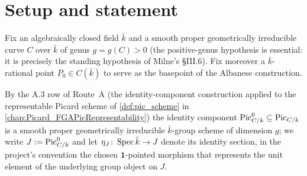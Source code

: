 %
%

\section{Setup and statement}
\label{sec:albaneseup_setup}

Fix an algebraically closed field \(\bar k\) and a smooth proper geometrically
irreducible curve \(C\) over \(\bar k\) of genus \(g = g(C) > 0\) (the positive-genus
hypothesis is essential: it is precisely the standing hypothesis of Milne's
\S III.6). Fix moreover a \(\bar k\)-rational point \(P_0 \in C(\bar k)\) to serve
as the basepoint of the Albanese construction.

By the A.3 row of Route~A (the identity-component construction applied to the
representable Picard scheme of
\cref{def:pic_scheme} in \cref{chap:Picard_FGAPicRepresentability}) the
identity component \(\operatorname{Pic}^0_{C/k} \subseteq \operatorname{Pic}_{C/k}\) is a smooth proper
geometrically irreducible \(\bar k\)-group scheme of dimension \(g\); we write
\(J := \operatorname{Pic}^0_{C/k}\) and let \(\eta_J \colon \operatorname{Spec} \bar k \to J\) denote its
identity section, in the project's convention the chosen \(\mathbf 1\)-pointed
morphism that represents the unit element of the underlying group object on
\(J\).

